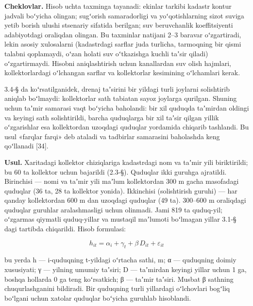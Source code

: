 \textbf{Cheklovlar.} Hisob uchta taxminga tayanadi: ekinlar tarkibi
kadastr kontur jadvali boʻyicha olingan; sugʻorish samaradorligi va
yoʻqotishlarning sizot suviga yetib borish ulushi stsenariy sifatida
berilgan; suv beruvchanlik koeffitsiyenti adabiyotdagi oraliqdan
olingan. Bu taxminlar natijani 2--3 baravar oʻzgartiradi, lekin asosiy
xulosalarni (kadastrdagi sarflar juda turlicha, tarmoqning bir qismi
talabni qoplamaydi, oʻzan holati suv oʻtkazishga kuchli taʼsir qiladi)
oʻzgartirmaydi. Hisobni aniqlashtirish uchun kanallardan suv olish
hajmlari, kollektorlardagi oʻlchangan sarflar va kollektorlar kesimining
oʻlchamlari kerak.


3.4-§ da koʻrsatilganidek, drenaj taʼsirini bir yildagi turli joylarni
solishtirib aniqlab boʻlmaydi: kollektorlar sath tabiatan sayoz joylarga
qurilgan. Shuning uchun taʼmir samarasi vaqt boʻyicha baholandi: bir xil
quduqda taʼmirdan oldingi va keyingi sath solishtirildi, barcha
quduqlarga bir xil taʼsir qilgan yillik oʻzgarishlar esa kollektordan
uzoqdagi quduqlar yordamida chiqarib tashlandi. Bu usul «farqlar farqi»
deb ataladi va tadbirlar samarasini baholashda keng qoʻllanadi {[}34{]}.

\textbf{Usul.} Xaritadagi kollektor chiziqlariga kadastrdagi nom va
taʼmir yili biriktirildi; bu 60 ta kollektor uchun bajarildi (2.3-§).
Quduqlar ikki guruhga ajratildi. Birinchisi --- nomi va taʼmir yili
maʼlum kollektordan 300 m gacha masofadagi quduqlar (36 ta, 28 ta
kollektor yonida). Ikkinchisi (solishtirish guruhi) --- har qanday
kollektordan 600 m dan uzoqdagi quduqlar (49 ta). 300--600 m oraliqdagi
quduqlar guruhlar aralashmasligi uchun olinmadi. Jami 819 ta quduq-yil;
oʻzgarmas qiymatli quduq-yillar va mustaqil maʼlumoti boʻlmagan yillar
3.1-§ dagi tartibda chiqarildi. Hisob formulasi:

\begin{equation}\tag{4.4}
h_{it} = \alpha_i + \gamma_t + \beta \, D_{it} + \varepsilon_{it}
\end{equation}

bu yerda h --- i-quduqning t-yildagi oʻrtacha sathi, m; α --- quduqning
doimiy xususiyati; γ --- yilning umumiy taʼsiri; D --- taʼmirdan keyingi
yillar uchun 1 ga, boshqa hollarda 0 ga teng koʻrsatkich; β --- taʼmir
taʼsiri. Musbat β sathning chuqurlashganini bildiradi. Bir quduqning
turli yillardagi oʻlchovlari bogʻliq boʻlgani uchun xatolar quduqlar
boʻyicha guruhlab hisoblandi.

